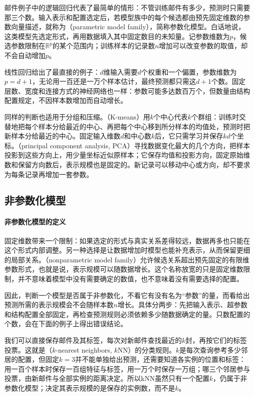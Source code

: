 邮件例子中的逻辑回归代表了最简单的情形：不管训练邮件有多少，预测时只需要那三个数。输入表示和配置选定后，若模型族中的每个候选都由预先固定维数的参数向量描述，就称为（parametric model family），简称参数化模型。白话地说，这类模型先选定形式，再用数据填入其中固定数目的未知量。记参数维数为$p$，候选参数限制在$\mathbb{R}^{p}$的某个范围内；训练样本的记录数$n$增加可以改变参数的取值，却不会自动增加$p$。

线性回归给出了最直接的例子：$d$维输入需要$d$个权重和一个偏置，参数维数为$p=d+1$，无论用一百还是一万个样本估计，最终预测都只需这$d+1$个数。固定层数、宽度和连接方式的神经网络也一样：参数可能多达数百万个，但数量由结构配置规定，不因样本数增加而自动增长。

同样的判断也适用于分组和压缩。（K-means）用$k$个中心代表$k$个群组：训练时交替地把每个样本分给最近的中心、再把每个中心移到所分样本的均值处，预测时把新样本分给最近的中心。固定输入维数$d$和中心数$k$后，它只需学习并保存$kd$个坐标。（principal component analysis, PCA）寻找数据变化最大的几个方向，把样本投影到这些方向上，用少量坐标近似原样本；它保存均值和投影方向，固定原始维数和保留方向数后，表示规模也是固定的。新记录可以移动中心或方向，却不要求为每条记录再增加一套参数。

\subsection{非参数化模型}
\label{sec:models-nonparametric}

\paragraph{非参数化模型的定义}

固定维数带来一个限制：如果选定的形式与真实关系差得较远，数据再多也只能在这个形式内部调整。另一种选择是让数据增加时模型也能补充表示，从而保留更细的局部关系。（nonparametric model family）允许候选关系超出预先固定的有限维参数形式，也就是说，表示规模可以随数据增长。这个名称放宽的只是固定维数限制，并不意味着模型中没有需要确定的数值，也不意味着没有需要选择的配置。

因此，判断一个模型是否属于非参数化，不看它有没有名为“参数”的量，而看给出预测所需的表示规模会不会随样本数$n$增长。具体分两步：先把输入表示、超参数和结构配置全部固定，再检查预测规则必须依赖多少随数据确定的量。只数配置的个数，会在下面的例子上得出错误结论。

我们可以直接保存邮件及其标签，每次对新邮件查找最近的$k$封，再按它们的标签投票。这就是（$k$-nearest neighbors, $k$NN）的分类规则。$k$是每次查询参考多少邻居的配置，但固定$k=3$并不能单独给出预测，还需要知道各实例的位置和标签：用一百个样本时保存一百组特征与标签，用一万个时保存一万组；哪三个邻居参与投票，由新邮件与全部实例的距离决定。所以kNN虽然只有一个配置$k$，仍属于非参数化模型；决定其表示规模的是保存的实例数，而不是$k$。

